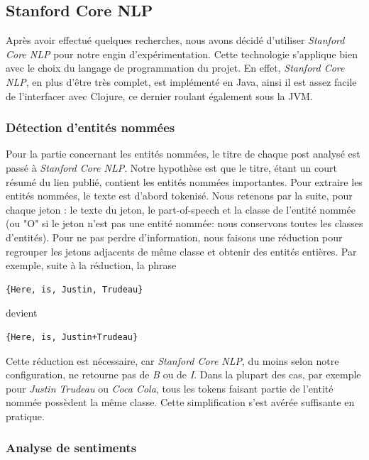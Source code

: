\documentclass[12pt]{article}
\begin{document}
\subsection{Stanford Core NLP}

Après avoir effectué quelques recherches, nous avons décidé d'utiliser \textit{Stanford Core NLP} pour notre engin d'expérimentation. Cette technologie s'applique bien avec le choix du langage de programmation du projet. En effet, \textit{Stanford Core NLP}, en plus d'être très complet, est implémenté en Java, ainsi il est assez facile de l'interfacer avec Clojure, ce dernier roulant également sous la JVM.

\subsubsection{Détection d'entités nommées}
\label{sec:named-entities}

Pour la partie concernant les entités nommées, le titre de chaque post analysé est passé à \textit{Stanford Core NLP}. Notre hypothèse est que le titre, étant un court
résumé du lien publié, contient les entités nommées importantes.
Pour extraire les entités nommées, le texte est d'abord tokenisé. Nous retenons par la suite, pour chaque jeton : le texte du jeton, le part-of-speech et la classe de l'entité nommée (ou "O" si le jeton n'est pas une entité nommée: nous conservons toutes les classes d'entités). Pour ne pas perdre d'information, nous faisons une réduction pour regrouper les jetons adjacents de même classe et obtenir des entités entières. Par exemple, suite à la réduction, la phrase

\begin{verbatim}
{Here, is, Justin, Trudeau}
\end{verbatim}

devient

\begin{verbatim}
{Here, is, Justin+Trudeau}
\end{verbatim}

Cette réduction est nécessaire, car \textit{Stanford Core NLP}, du moins selon notre configuration, ne retourne pas de \textit{B} ou de \textit{I}.
Dans la plupart des cas, par exemple pour \emph{Justin Trudeau} ou \emph{Coca Cola}, tous les tokens faisant partie de l'entité nommée possèdent la même
classe. Cette simplification s'est avérée suffisante en pratique.

\subsubsection{Analyse de sentiments}
\label{sec:sentiment-analysis}
\end{document}
